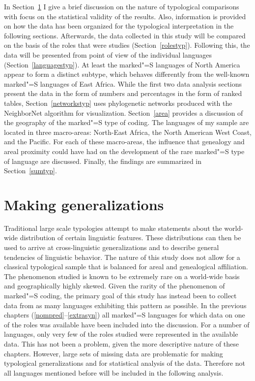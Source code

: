 In Section~\ref{general} I give a brief discussion on the nature of typological comparisons with focus on the statistical validity of the results.
Also, information is provided on how the data has been organized for the typological interpretation in the following sections.
Afterwards, the data collected in this study will be compared on the basis of the roles that were studies (Section~\ref{rolestyp}). 
Following this, the data will be presented from point of view of the individual languages (Section~\ref{languagestyp}). 
At least the marked"=S languages of North America appear to form a distinct subtype, which behaves differently from the well-known marked"=S languages of East Africa. 
While the first two data analysis sections present the data in the form of numbers and percentages in the form of ranked tables, Section~\ref{networkstyp} uses phylogenetic networks produced with the NeighborNet algorithm \citep{NeighborNet} for visualization.
Section~\ref{area} provides a discussion of the geography of the marked"=S type of coding. 
The languages of my sample are located in three macro-areas: North-East Africa, the North American West Coast, and the Pacific. 
For each of these macro-areas, the influence that genealogy and areal proximity could have had on the development of the rare marked"=S type of language are discussed.
Finally, the findings are summarized in Section~\ref{sumtyp}.
     

\section{Making generalizations}\label{general}

Traditional large scale typologies attempt to make statements about the world-wide distribution of certain linguistic features.
These distributions can then be used to arrive at cross-linguistic generalizations and to describe general tendencies of linguistic behavior.
The nature of this study  does not allow for a classical typological sample that is balanced for areal and genealogical affiliation. 
The phenomenon studied is known to be extremely rare on a world-wide basis and geographically highly skewed.
Given the rarity of the phenomenon of marked"=S coding, the primary goal of this study has instead been to collect data from as many languages exhibiting this pattern as possible. 
In the previous chapters (\ref{nompred}--\ref{extrasyn}) all marked"=S languages for which data on one of the roles was available have been included into the discussion. 
For a number of languages, only very few of the roles studied were represented in the available data. 
This has not been a problem, given the more descriptive nature of these chapters. 
However, large sets of missing data are problematic for making typological generalizations and for statistical analysis of the data. 
Therefore not all languages mentioned before will be included in the following analysis. 

